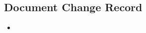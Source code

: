 \subsection{Document Change Record} %
\label{sub:document_change_record}
\begin{itemize}
  \item \theversion
\end{itemize}
